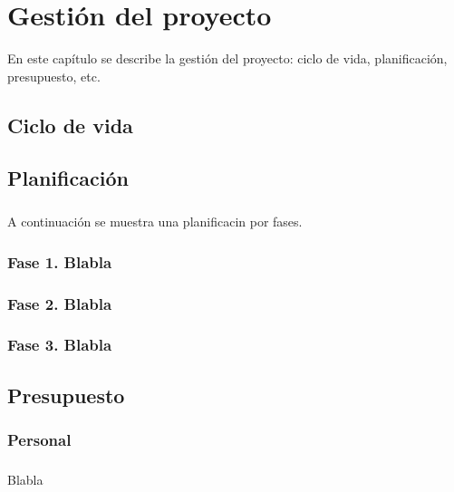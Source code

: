 \chapter{Gestión del proyecto}\label{sec:gestion}

En este capítulo se describe la gestión del proyecto: ciclo de vida, planificación,
presupuesto, etc.

\section{Ciclo de vida}


\section{Planificación}

\paragraph{}A continuación se muestra una planificacin por fases.

\subsection{Fase 1. Blabla}

\subsection{Fase 2. Blabla}

\subsection{Fase 3. Blabla}

\section{Presupuesto}

\subsection{Personal}

\paragraph{} Blabla


